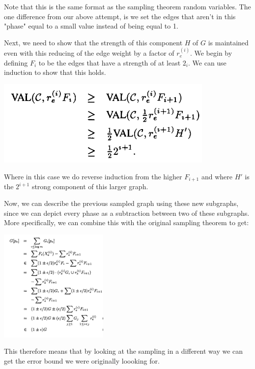 \documentclass[11pt]{article}
\begin{document}
Note that this is the same format as the sampling theorem random variables. The one difference from our above attempt, is we set the edges that aren't in this "phase" equal to a small value instead of being equal to 1.

Next, we need to show that the strength of this component $H$ of $G$ is maintained even with this reducing of the edge weight by a factor of $r_e^{(i)}$. We begin by defining $F_i$ to be the edges that have a strength of at least $2_i$. We can use induction to show that this holds.

\begin{center}
\includegraphics[width=0.8\textwidth]{figures/induction.png}
\end{center}

Where in this case we do reverse induction from the higher $F_{i+1}$ and where $H'$ is the $2^{i+1}$ strong component of this larger graph. 

Now, we can describe the previous sampled graph using these new subgraphs, since we can depict every phase as a subtraction between two of these subgraphs. More specifically, we can combine this with the original sampling theorem to get:

\begin{center}
\includegraphics[width=0.4\textwidth]{figures/error_proof.png}
\end{center}

This therefore means that by looking at the sampling in a different way we can get the error bound we were originally loooking for.
\end{document}
